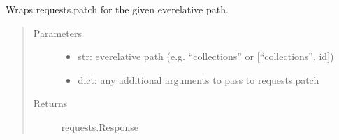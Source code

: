 \documentclass[letterpaper,10pt,english]{sphinxmanual}
\begin{document}
\begin{fulllineitems}
\label{\detokenize{autoapi/pine/backend/data/service/index:pine.backend.data.service.patch}}
Wraps requests.patch for the given eve\sphinxhyphen{}relative path.
\begin{quote}\begin{description}
\item[{Parameters}] \leavevmode\begin{itemize}
\item {} 
 \textendash{} str: eve\sphinxhyphen{}relative path (e.g. “collections” or {[}“collections”, id{]})

\item {} 
 \textendash{} 
dict: any additional arguments to pass to requests.patch


\end{itemize}

\item[{Returns}] \leavevmode
requests.Response

\end{description}\end{quote}

\end{fulllineitems}


\begin{fulllineitems}
\label{\detokenize{autoapi/pine/backend/data/service/index:pine.backend.data.service.get_items}}
\end{fulllineitems}


\begin{fulllineitems}
\label{\detokenize{autoapi/pine/backend/data/service/index:pine.backend.data.service.get_item_by_id}}
\end{fulllineitems}
\end{document}

